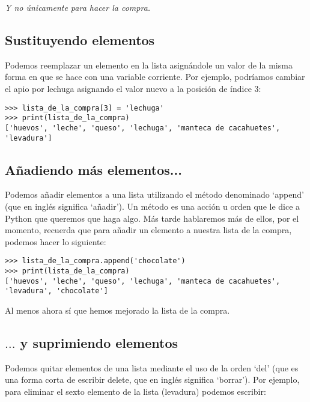 \noindent
\emph{Y no únicamente para hacer la compra.}

\subsection*{\color{BrickRed}Sustituyendo elementos}

Podemos reemplazar un elemento en la lista asignándole un valor de la misma forma en que se hace con una variable corriente. Por ejemplo, podríamos cambiar el apio por lechuga asignando el valor nuevo a la posición de índice 3:

\begin{listing}
\begin{verbatim}
>>> lista_de_la_compra[3] = 'lechuga'
>>> print(lista_de_la_compra)
['huevos', 'leche', 'queso', 'lechuga', 'manteca de cacahuetes', 'levadura']
\end{verbatim}
\end{listing}

\subsection*{\color{BrickRed}Añadiendo más elementos...}

Podemos añadir elementos a una lista utilizando el método denominado `append' (que en inglés significa `añadir'). Un método es una acción u orden que le dice a Python que queremos que haga algo. Más tarde hablaremos más de ellos, por el momento, recuerda que para añadir un elemento a nuestra lista de la compra, podemos hacer lo siguiente: 

\begin{listing}
\begin{verbatim}
>>> lista_de_la_compra.append('chocolate')
>>> print(lista_de_la_compra)
['huevos', 'leche', 'queso', 'lechuga', 'manteca de cacahuetes', 'levadura', 'chocolate']
\end{verbatim}
\end{listing}

Al menos ahora sí que hemos mejorado la lista de la compra.

\subsection*{\color{BrickRed}$\ldots$ y suprimiendo elementos}

Podemos quitar elementos de una lista mediante el uso de la orden `del' (que es una forma corta de escribir delete, que en inglés significa `borrar').  Por ejemplo, para eliminar el sexto elemento de la lista (levadura) podemos escribir:


